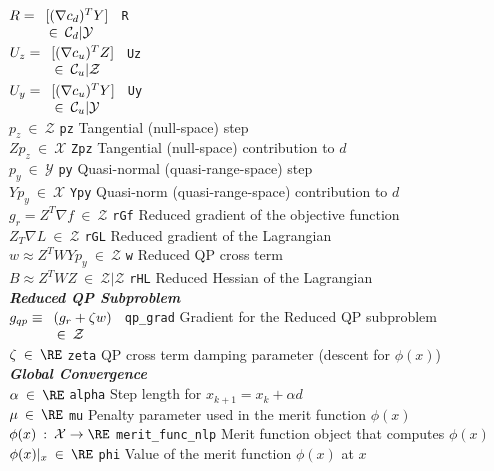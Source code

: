 {\begin{tabbing}
$R = 	\begin{array}[t]{l}
			[ (\nabla c_d)^T Y ] \\
			\:\in\: \mathcal{C}_d|\mathcal{Y}
		\end{array}$
	\> \texttt{R}
		\> \\
$U_z = \begin{array}[t]{l}
			[(\nabla c_u)^T Z] \\
			\:\in\: \mathcal{C}_u|\mathcal{Z}
		\end{array}$
	\> \texttt{Uz}
		\> \\
$U_y = \begin{array}[t]{l}
			[(\nabla c_u)^T Y] \\
			\:\in\: \mathcal{C}_u|\mathcal{Y}
		\end{array}$
	\> \texttt{Uy}
		\> \\
$p_z \:\in\: \mathcal{Z}$
	\> \texttt{pz}
		\> Tangential (null-space) step \\
$Z p_z \:\in\: \mathcal{X}$
	\> \texttt{Zpz}
		\> Tangential (null-space) contribution to $d$ \\
$p_y \:\in\: \mathcal{Y}$
	\> \texttt{py}
		\> Quasi-normal (quasi-range-space) step \\
$Y p_y \:\in\: \mathcal{X}$
	\> \texttt{Ypy}
		\> Quasi-norm (quasi-range-space) contribution to $d$ \\
$g_r = Z^T \nabla f \:\in\: \mathcal{Z}$
	\> \texttt{rGf}
		\> Reduced gradient of the objective function \\
$Z_T \nabla L \:\in\: \mathcal{Z}$
	\> \texttt{rGL}
		\> Reduced gradient of the Lagrangian \\
$w \approx Z^T W Y p_y \:\in\: \mathcal{Z}$
	\> \texttt{w}
		\> Reduced QP cross term \\
$B \approx Z^T W Z  \:\in\: \mathcal{Z}|\mathcal{Z}$
	\> \texttt{rHL}
		\> Reduced Hessian of the Lagrangian \\

\textbf{\textit{Reduced QP Subproblem}} \\
$g_{qp} \equiv
		\begin{array}[t]{l}
			( g_r + \zeta w ) \\
			\:\in\: \mathcal{Z}
		\end{array}$
	\> \texttt{qp\_grad}
		\> Gradient for the Reduced QP subproblem \\
$\zeta \:\in\: \RE$
	\> \texttt{zeta}
		\> QP cross term damping parameter (descent for $\phi(x)$) \\

\textbf{\textit{Global Convergence}} \\
$\alpha \:\in\: \RE$
	\> \texttt{alpha}
		\> Step length for $x_{k+1} = x_{k} + \alpha d$ \\
$\mu \:\in\: \RE$
	\> \texttt{mu}
		\> Penalty parameter used in the merit function $\phi(x)$ \\
$\phi(x) \: : \: \mathcal{X} \rightarrow \RE$
	\> \texttt{merit\_func\_nlp}
		\> Merit function object that computes $\phi(x)$ \\
$\phi(x)|_x \:\in\: \RE$
	\> \texttt{phi}
		\> Value of the merit function $\phi(x)$ at $x$ \\


\end{tabbing}}
